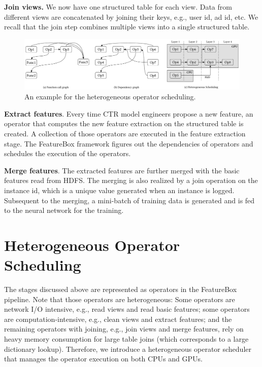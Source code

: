 \documentclass[sigconf]{acmart}
\begin{document}
\textbf{Join views.} 
We now have one structured table for each view. 
Data from different views are concatenated by joining their keys, e.g., user id, ad id, etc. 
We recall that the join step combines multiple views into a single structured table.

\begin{figure}[htp]
\includegraphics[width=\textwidth]{figs/dag}
\caption{An example for the heterogeneous operator scheduling.}
\label{fig:dag}%
\end{figure}

\textbf{Extract features}.
Every time CTR model engineers propose a new feature, an operator that computes the new feature extraction on the structured table is created. 
A collection of those operators are executed in the feature extraction stage. 
The FeatureBox framework figures out the dependencies of operators and schedules the execution of the operators.



\textbf{Merge features}. 
The extracted features are further merged with the basic features read from HDFS. The merging is also realized by a join operation on the instance id, which is a unique value generated when an instance is logged. 
Subsequent to the merging, a mini-batch of training data is generated and is fed to the neural network for the training.



\section{Heterogeneous Operator Scheduling}
The stages discussed above are represented as operators in the FeatureBox pipeline. Note that those operators are heterogeneous: Some operators are network I/O intensive, e.g., read views and read basic features; some operators are computation-intensive, e.g., clean views and extract features; and the remaining operators with joining, e.g., join views and merge features, rely on heavy memory consumption for large table joins (which corresponds to a large dictionary lookup). Therefore, we introduce a heterogeneous operator scheduler that manages the operator execution on both CPUs and GPUs. 
\end{document}
